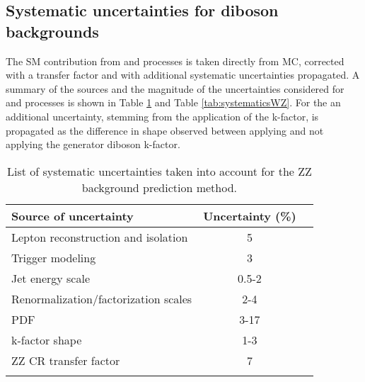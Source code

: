 \subsection*{Systematic uncertainties for diboson backgrounds}
\noindent
\justify
The SM contribution from \PWZ and \PZZ processes is taken directly from MC, corrected with a transfer factor and with additional systematic uncertainties propagated.
A summary of the sources and the magnitude of the uncertainties considered for \PZZ and \PWZ processes is shown in Table \ref{tab:systematicsZZ} and Table \ref{tab:systematicsWZ}.
For the \PZZ an additional uncertainty, stemming from the application of the k-factor, is propagated as the difference in shape observed between applying and not applying the generator diboson \pt k-factor.
\begin{table}[!hbtp]
\renewcommand{\arraystretch}{1.2}
\setlength{\belowcaptionskip}{6pt}
\small
\centering
\caption{
List of systematic uncertainties taken into account for the ZZ background prediction method.}
\begin{tabular}{l c c}
\hline\hline
Source of uncertainty                         & Uncertainty (\%)     \\
\hline
Lepton reconstruction and isolation     &      {5}                   \\ %
Trigger modeling                        &      {3}                   \\ %
Jet energy scale                        &      {0.5-2}                  \\ %
Renormalization/factorization scales    &      {2-4}                 \\ %
PDF                                     &      {3-17}                 \\ %
k-factor shape                          &      {1-3}                 \\ %
ZZ CR transfer factor             &      {7}                 \\ %
\hline\hline
\label{tab:systematicsZZ}
\end{tabular}
\end{table}
